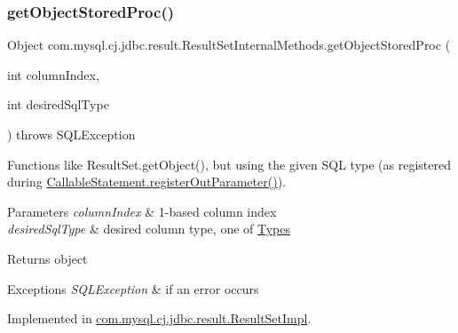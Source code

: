 \mbox{\label{interfacecom_1_1mysql_1_1cj_1_1jdbc_1_1result_1_1_result_set_internal_methods_a2a06ef27f3e32523ff5d6b8e04f7586b}} 
\subsubsection{\texorpdfstring{get\+Object\+Stored\+Proc()}{getObjectStoredProc()}\hspace{0.1cm}{\footnotesize\ttfamily [1/4]}}
{\footnotesize\ttfamily Object com.\+mysql.\+cj.\+jdbc.\+result.\+Result\+Set\+Internal\+Methods.\+get\+Object\+Stored\+Proc (\begin{DoxyParamCaption}\item[{int}]{column\+Index,  }\item[{int}]{desired\+Sql\+Type }\end{DoxyParamCaption}) throws S\+Q\+L\+Exception}

Functions like Result\+Set.\+get\+Object(), but using the given S\+QL type (as registered during \mbox{\hyperlink{classcom_1_1mysql_1_1cj_1_1jdbc_1_1_callable_statement_affc71b6220a237feb94f842a2347d1da}{Callable\+Statement.\+register\+Out\+Parameter()}}).


\begin{DoxyParams}{Parameters}
{\em column\+Index} & 1-\/based column index \\
\hline
{\em desired\+Sql\+Type} & desired column type, one of \mbox{\hyperlink{}{Types}} \\
\hline
\end{DoxyParams}
\begin{DoxyReturn}{Returns}
object 
\end{DoxyReturn}

\begin{DoxyExceptions}{Exceptions}
{\em S\+Q\+L\+Exception} & if an error occurs \\
\hline
\end{DoxyExceptions}


Implemented in \mbox{\hyperlink{classcom_1_1mysql_1_1cj_1_1jdbc_1_1result_1_1_result_set_impl_a3dfdc0ed2f2b5498834ffbf5a0269e1a}{com.\+mysql.\+cj.\+jdbc.\+result.\+Result\+Set\+Impl}}.

